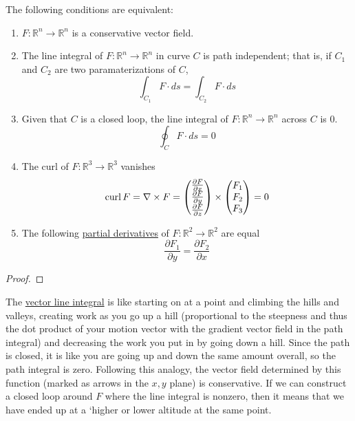   \begin{corollary}
    \label{thm:equivalent-conditions-for-vector-field-to-be}
		The following conditions are equivalent: 
		\begin{enumerate}
			\item $F: \mathbb{R}^n \to \mathbb{R}^n$ is a conservative vector field. 
			\item The line integral of $F: \mathbb{R}^n \to \mathbb{R}^n$ in curve $C$ is path independent; that is, if $C_1$ and $C_2$ are two paramaterizations of $C$, 
			\begin{equation}
			  \int_{C_1} F \cdot ds = \int_{C_2} F \cdot ds
			\end{equation}
			\item Given that $C$ is a closed loop, the line integral of $F: \mathbb{R}^n \to \mathbb{R}^n$ across $C$ is $0$. 
			\begin{equation}
			  \oint_C F \cdot ds = 0
			\end{equation}
			\item The curl of $F: \mathbb{R}^3 \to \mathbb{R}^3$ vanishes
			\begin{equation}
			  \operatorname{curl}{F} = \nabla \times F = \begin{pmatrix}
			  			\frac{\partial F}{\partial x} \\\frac{\partial F}{\partial y} \\\frac{\partial F}{\partial z}
			  			\end{pmatrix} \times \begin{pmatrix}
			  			F_1\\F_2\\F_3
			  			\end{pmatrix}= 0
			\end{equation}
			\item The following \hyperref[def:partial-derivative]{partial derivatives} of $F: \mathbb{R}^2 \to \mathbb{R}^2$ are equal
			\begin{equation}
			  \frac{\partial F_1}{\partial y} = \frac{\partial F_2}{\partial x}
			\end{equation}
		\end{enumerate}
  \end{corollary}
	\begin{proof}
	\end{proof}
		
	The \hyperref[def:vector-line-integral]{vector line integral} is like starting on at a point and climbing the hills and valleys, creating work as you go up a hill (proportional to the steepness and thus the dot product of your motion vector with the gradient vector field in the path integral) and decreasing the work you put in by going down a hill. Since the path is closed, it is like you are going up and down the same amount overall, so the path integral is zero. Following this analogy, the vector field determined by this function (marked as arrows in the $x, y$ plane) is conservative. If we can construct a closed loop around $F$ where the line integral is nonzero, then it means that we have ended up at a `higher or lower altitude at the same point. 
		
